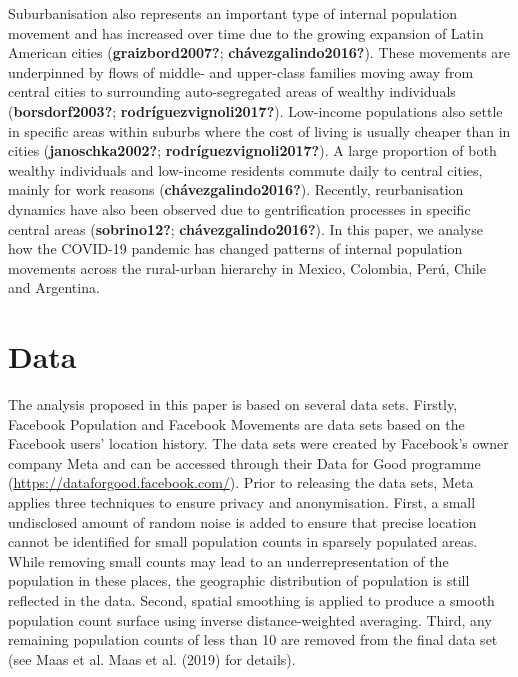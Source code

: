 \documentclass[11pt,letterpaper]{article}
\begin{document}
Suburbanisation also represents an important type of internal population
movement and has increased over time due to the growing expansion of
Latin American cities (\textbf{graizbord2007?};
\textbf{chávezgalindo2016?}). These movements are underpinned by flows
of middle- and upper-class families moving away from central cities to
surrounding auto-segregated areas of wealthy individuals
(\textbf{borsdorf2003?}; \textbf{rodríguezvignoli2017?}). Low-income
populations also settle in specific areas within suburbs where the cost
of living is usually cheaper than in cities (\textbf{janoschka2002?};
\textbf{rodríguezvignoli2017?}). A large proportion of both wealthy
individuals and low-income residents commute daily to central cities,
mainly for work reasons (\textbf{chávezgalindo2016?}). Recently,
reurbanisation dynamics have also been observed due to gentrification
processes in specific central areas (\textbf{sobrino12?};
\textbf{chávezgalindo2016?}). In this paper, we analyse how the COVID-19
pandemic has changed patterns of internal population movements across
the rural-urban hierarchy in Mexico, Colombia, Perú, Chile and
Argentina.

\section{Data}

The analysis proposed in this paper is based on several data sets.
Firstly, Facebook Population and Facebook Movements are data sets based
on the Facebook users' location history. The data sets were created by
Facebook's owner company Meta and can be accessed through their Data for
Good programme (\url{https://dataforgood.facebook.com/}). Prior to
releasing the data sets, Meta applies three techniques to ensure privacy
and anonymisation. First, a small undisclosed amount of random noise is
added to ensure that precise location cannot be identified for small
population counts in sparsely populated areas. While removing small
counts may lead to an underrepresentation of the population in these
places, the geographic distribution of population is still reflected in
the data. Second, spatial smoothing is applied to produce a smooth
population count surface using inverse distance-weighted averaging.
Third, any remaining population counts of less than 10 are removed from
the final data set (see Maas et al. Maas et al. (2019) for details).
\end{document}
